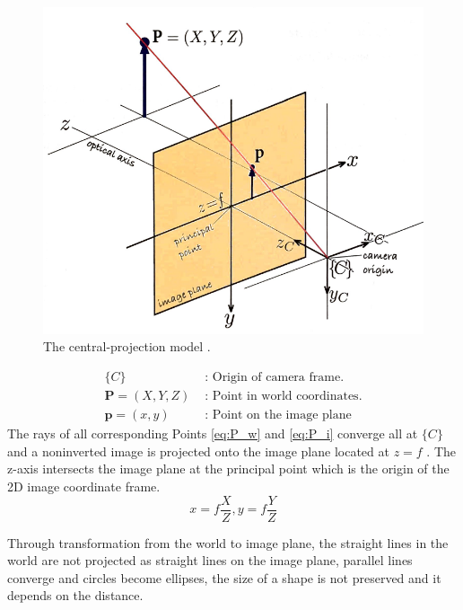 \documentclass[journal,final,a4paper,twoside]{PS}
\begin{document}
\begin{figure}[h]
\begin{center}
\includegraphics[scale=0.6]{./pics/CenterProjectionModel.png}
\caption{The central-projection model \cite{Corke}.}
\label{fig:projectionModel}
\end{center}
\end{figure}
\begin{subequations}
\begin{align}
\{C\}&\text{ : Origin of camera frame.}\label{eq:C_origin}\\
\textbf{P}=\left( X,Y,Z\right)&\text{ : Point in world coordinates.}\label{eq:P_w}\\
\textbf{p}=(x,y)&\text{ : Point on the image plane}\label{eq:P_i}
\end{align}
\end{subequations}
The rays of all corresponding Points \ref{eq:P_w} and \ref{eq:P_i} converge all at $\{C\}$ and a noninverted image is projected onto the image plane located at $z=f$ \cite{Ma:2010}. The z-axis intersects the image plane at the principal point which is the origin of the 2D image coordinate frame.
\begin{equation}
x=f\frac{X}{Z}, y=f\frac{Y}{Z}
\end{equation}

Through transformation from the world to image plane, the straight lines in the world are not projected as straight lines on the image plane, parallel lines converge and circles become ellipses, the size of a shape is not preserved and it depends on the distance.
\end{document}
